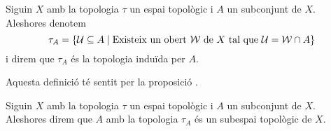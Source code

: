 \documentclass[../Apunts.tex]{subfiles}
\begin{document}
	\begin{definition}
		\label{def:topologia induida per un subconjunt}
		Siguin \(X\) amb la topologia \(\tau\) un espai topològic i \(A\) un subconjunt de \(X\). Aleshores denotem
		\[\tau_{A}=\{\mathcal{U}\subseteq A\mid\text{Existeix un obert }\mathcal{W}\text{ de }X\text{ tal que }\mathcal{U}=\mathcal{W}\cap A\}\]
		i direm que \(\tau_{A}\) és la topologia induïda per \(A\).
		
		Aquesta definició té sentit per la proposició .
	\end{definition}
	\begin{definition}
		\label{def:subespai topològic}
		Siguin \(X\) amb la topologia \(\tau\) un espai topològic i \(A\) un subconjunt de \(X\). Aleshores direm que \(A\) amb la topologia \(\tau_{A}\) és un subespai topològic de \(X\).
	\end{definition}
\end{document}
